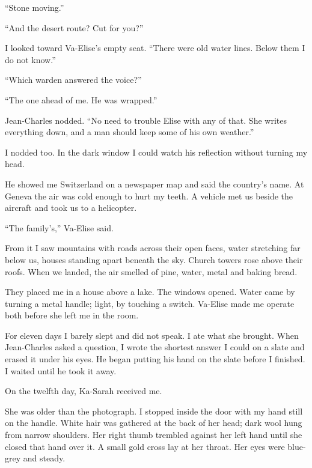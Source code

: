 ``Stone moving.''\par

``And the desert route? Cut for you?''\par

I looked toward Va-Elise's empty seat. ``There were old water lines. Below them I do not know.''\par

``Which warden answered the voice?''\par

``The one ahead of me. He was wrapped.''\par

Jean-Charles nodded. ``No need to trouble Elise with any of that. She writes everything down, and a man should keep some of his own weather.''\par

I nodded too. In the dark window I could watch his reflection without turning my head.\par

He showed me Switzerland on a newspaper map and said the country's name. At Geneva the air was cold enough to hurt my teeth. A vehicle met us beside the aircraft and took us to a helicopter.\par

``The family's,'' Va-Elise said.\par

From it I saw mountains with roads across their open faces, water stretching far below us, houses standing apart beneath the sky. Church towers rose above their roofs. When we landed, the air smelled of pine, water, metal and baking bread.\par

They placed me in a house above a lake. The windows opened. Water came by turning a metal handle; light, by touching a switch. Va-Elise made me operate both before she left me in the room.\par

For eleven days I barely slept and did not speak. I ate what she brought. When Jean-Charles asked a question, I wrote the shortest answer I could on a slate and erased it under his eyes. He began putting his hand on the slate before I finished. I waited until he took it away.\par

On the twelfth day, Ka-Sarah received me.\par

She was older than the photograph. I stopped inside the door with my hand still on the handle. White hair was gathered at the back of her head; dark wool hung from narrow shoulders. Her right thumb trembled against her left hand until she closed that hand over it. A small gold cross lay at her throat. Her eyes were blue-grey and steady.\par

